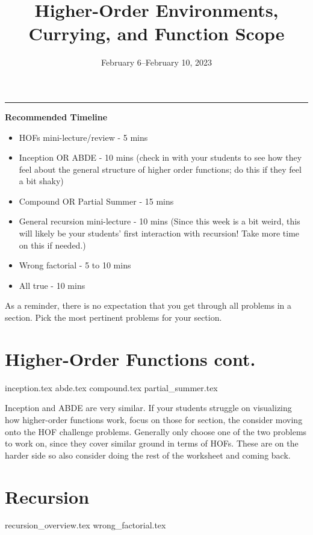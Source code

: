 \documentclass{exam}
\title{Higher-Order Environments, Currying, and Function Scope}
\date{February 6--February 10, 2023}
\begin{document}
\maketitle
\rule{\textwidth}{0.15em}
\fontsize{12}{15}\selectfont

\begin{meta}
\textbf{Recommended Timeline}
\begin{itemize}
    \item HOFs mini-lecture/review - 5 mins
    \item Inception OR ABDE - 10 mins (check in with your students to see how they feel about the general structure of higher order functions; do this if they feel a bit shaky)
    \item Compound OR Partial Summer - 15 mins
    \item General recursion mini-lecture - 10 mins (Since this week is a bit weird, this will likely be your students' first interaction with recursion! Take more time on this if needed.)
    \item Wrong factorial - 5 to 10 mins
    \item All true - 10 mins
\end{itemize}
As a reminder, there is no expectation that you get through all problems in a section. Pick the most pertinent problems for your section. 
\end{meta}

\begin{questions}
    \section{Higher-Order Functions cont.}
    {inception.tex}
    {abde.tex}
    {compound.tex}
    {partial_summer.tex}
    \begin{questionmeta}
        Inception and ABDE are very similar. If your students struggle on visualizing how higher-order functions work, focus on those for section, the consider moving onto the HOF challenge problems. \n
        Generally only choose one of the two problems to work on, since they cover similar ground in terms of HOFs. These are on the harder side so also consider doing the rest of the worksheet and coming back.
    \end{questionmeta}

    \section{Recursion}
    {recursion_overview.tex}
    {wrong_factorial.tex}
\end{questions}
\end{document}
